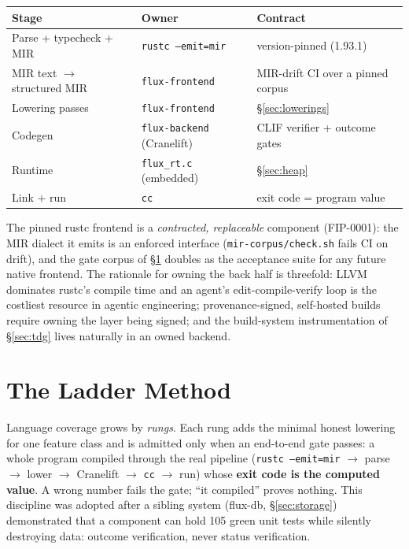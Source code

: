 \documentclass[11pt]{article}
\begin{document}
\begin{center}
\begin{tabular}{lll}
\toprule
Stage & Owner & Contract \\
\midrule
Parse + typecheck + MIR & \texttt{rustc --emit=mir} & version-pinned (1.93.1) \\
MIR text $\to$ structured MIR & \texttt{flux-frontend} & MIR-drift CI over a pinned corpus \\
Lowering passes & \texttt{flux-frontend} & \S\ref{sec:lowerings} \\
Codegen & \texttt{flux-backend} (Cranelift) & CLIF verifier + outcome gates \\
Runtime & \texttt{flux\_rt.c} (embedded) & \S\ref{sec:heap} \\
Link + run & \texttt{cc} & exit code = program value \\
\bottomrule
\end{tabular}
\end{center}

The pinned rustc frontend is a \emph{contracted, replaceable} component
(FIP-0001): the MIR dialect it emits is an enforced interface
(\texttt{mir-corpus/check.sh} fails CI on drift), and the gate corpus of
\S\ref{sec:ladder} doubles as the acceptance suite for any future native
frontend. The rationale for owning the back half is threefold: LLVM dominates
rustc's compile time and an agent's edit-compile-verify loop is the costliest
resource in agentic engineering; provenance-signed, self-hosted builds require
owning the layer being signed; and the build-system instrumentation of
\S\ref{sec:tdg} lives naturally in an owned backend.

\section{The Ladder Method}\label{sec:ladder}
Language coverage grows by \emph{rungs}. Each rung adds the minimal honest
lowering for one feature class and is admitted only when an end-to-end gate
passes: a whole program compiled through the real pipeline
(\texttt{rustc --emit=mir} $\to$ parse $\to$ lower $\to$ Cranelift $\to$
\texttt{cc} $\to$ run) whose \textbf{exit code is the computed value}. A wrong
number fails the gate; ``it compiled'' proves nothing. This discipline was
adopted after a sibling system (flux-db, \S\ref{sec:storage}) demonstrated that
a component can hold 105 green unit tests while silently destroying data:
outcome verification, never status verification.
\end{document}
